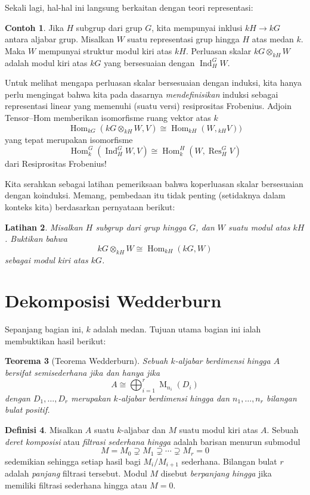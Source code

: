 \documentclass[12pt]{article}
\theoremstyle{plain}
\newtheorem{theorem}{Teorema}[section]
\newtheorem{exercise}[theorem]{Latihan}
\theoremstyle{definition}
\newtheorem{definition}[theorem]{Definisi}
\newtheorem{example}[theorem]{Contoh}
\theoremstyle{remark}
\numberwithin{equation}{section}
\begin{document}
Sekali lagi, hal-hal ini langsung berkaitan dengan teori representasi:

\begin{example}
Jika $H$ subgrup dari grup $G$, kita mempunyai inklusi
$kH \to kG$ antara aljabar grup.
Misalkan $W$ suatu representasi grup hingga $H$ atas medan $k$.
Maka $W$ mempunyai struktur modul kiri atas $kH$.
Perluasan skalar $kG \otimes_{kH} W$
adalah modul kiri atas $kG$ yang bersesuaian dengan $\operatorname{Ind}_H^G W$.
\end{example} 

Untuk melihat mengapa perluasan skalar bersesuaian dengan induksi, kita hanya perlu
mengingat bahwa kita pada dasarnya \emph{mendefinisikan} induksi sebagai representasi
linear yang memenuhi (suatu versi) resiprositas Frobenius.
Adjoin Tensor--Hom memberikan isomorfisme ruang vektor atas $k$
\[
\operatorname{Hom}_{kG}(kG \otimes_{kH} W,V)
\cong \operatorname{Hom}_{kH}(W,{}_{kH}V))
\]
yang tepat merupakan isomorfisme
\[
\operatorname{Hom}_k^G(\operatorname{Ind}_H^G W,V)
\cong \operatorname{Hom}_k^H(W,\operatorname{Res}_H^G V)
\]
dari Resiprositas Frobenius!

Kita serahkan sebagai latihan pemeriksaan bahwa koperluasan skalar
bersesuaian dengan koinduksi. Memang, pembedaan itu tidak penting
(setidaknya dalam konteks kita) berdasarkan pernyataan berikut:

\begin{exercise}
Misalkan $H$ subgrup dari grup hingga $G$, dan $W$ suatu modul atas $kH$.
Buktikan bahwa
\[
kG \otimes_{kH} W \cong \operatorname{Hom}_{kH}(kG,W)
\]
sebagai modul kiri atas $kG$.
\end{exercise}

\section{Dekomposisi Wedderburn}

Sepanjang bagian ini, $k$ adalah medan.
Tujuan utama bagian ini ialah membuktikan hasil berikut:

\begin{theorem}[Teorema Wedderburn] \label{thm:Wedderburn}
Sebuah $k$-aljabar berdimensi hingga $A$ bersifat \emph{semisederhana}
jika dan hanya jika
\[
A \cong \bigoplus_{i=1}^r \operatorname{M}_{n_i}(D_i)
\]
dengan $D_1, \ldots, D_r$ merupakan $k$-aljabar berdimensi hingga
dan $n_1,\ldots, n_r$ bilangan bulat positif.
\end{theorem}

\begin{definition}
Misalkan $A$ suatu $k$-aljabar dan $M$ suatu modul kiri atas $A$.
Sebuah \emph{deret komposisi} atau \emph{filtrasi sederhana hingga}
adalah barisan menurun submodul
\[
M=M_0 \supsetneq M_1 \supsetneq \cdots \supsetneq M_r = 0
\]
sedemikian sehingga setiap hasil bagi $M_i/M_{i+1}$ sederhana.
Bilangan bulat $r$ adalah \emph{panjang} filtrasi tersebut.
Modul $M$ disebut \emph{berpanjang hingga} jika memiliki filtrasi sederhana
hingga atau $M=0$.
\end{definition}
\end{document}
